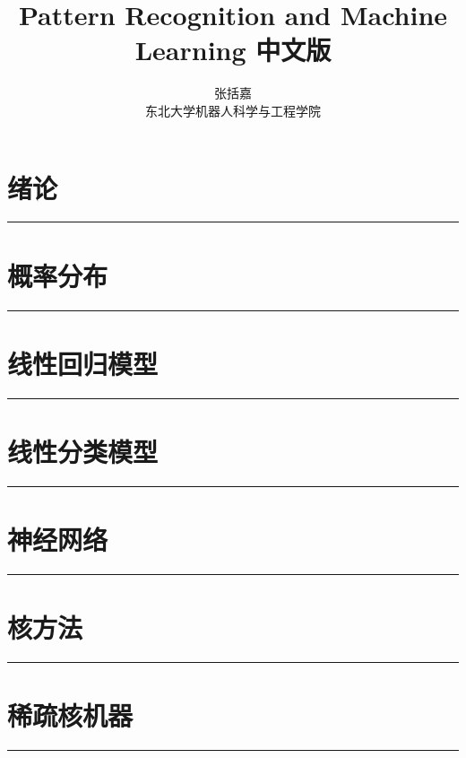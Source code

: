 \documentclass[10pt, b5paper]{book}
\author{张括嘉 \\ 东北大学机器人科学与工程学院}
\renewcommand {\thetable} {\thechapter{}.\arabic{table}}
\renewcommand {\thefigure} {\thechapter{}.\arabic{figure}}
\numberwithin{equation}{chapter}
\begin{document}
\title{Pattern Recognition and Machine Learning 中文版}
\date{}
	\chapter{绪论}
	\noindent\rule[0.25\baselineskip]{\textwidth}{1pt}
	\renewcommand {\thetable} {\thechapter{}.\arabic{table}}
	\renewcommand {\thefigure} {\thechapter{}.\arabic{figure}}
	
	\chapter{概率分布}
	\noindent\rule[0.25\baselineskip]{\textwidth}{1pt}
	\renewcommand {\thetable} {\thechapter{}.\arabic{table}}
	\renewcommand {\thefigure} {\thechapter{}.\arabic{figure}}
	
	\chapter{线性回归模型}
	\noindent\rule[0.25\baselineskip]{\textwidth}{1pt}
	\renewcommand {\thetable} {\thechapter{}.\arabic{table}}
	\renewcommand {\thefigure} {\thechapter{}.\arabic{figure}}
	
	\chapter{线性分类模型}
	\noindent\rule[0.25\baselineskip]{\textwidth}{1pt}
	\renewcommand {\thetable} {\thechapter{}.\arabic{table}}
	\renewcommand {\thefigure} {\thechapter{}.\arabic{figure}}

	\chapter{神经网络}
	\noindent\rule[0.25\baselineskip]{\textwidth}{1pt}
	\renewcommand {\thetable} {\thechapter{}.\arabic{table}}
	\renewcommand {\thefigure} {\thechapter{}.\arabic{figure}}
	
	\chapter{核方法}
	\noindent\rule[0.25\baselineskip]{\textwidth}{1pt}
	\renewcommand {\thetable} {\thechapter{}.\arabic{table}}
	\renewcommand {\thefigure} {\thechapter{}.\arabic{figure}}

	\chapter{稀疏核机器}
	\noindent\rule[0.25\baselineskip]{\textwidth}{1pt}
	\renewcommand {\thetable} {\thechapter{}.\arabic{table}}
	\renewcommand {\thefigure} {\thechapter{}.\arabic{figure}}
\end{document}
